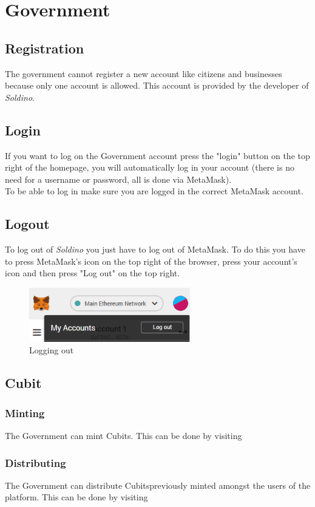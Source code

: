\section{Government}
	\subsection{Registration}
	The government cannot register a new account like citizens and 
	businesses because only one account is allowed. This account is provided 
	by the developer of \textit{Soldino}.
	\subsection{Login}
	If you want to log on the Government account press the "login" button on the 
	top right of the homepage, you will automatically log in your account 
	(there is no need for a username or password, all is done via MetaMask). 
	\\To be able to log in make sure you are logged in the correct MetaMask\glosp 
	account.
	\subsection{Logout}
	To log out of \textit{Soldino} you just have to log out of 
	MetaMask\glosp. To do this you have to press MetaMask's icon on the top 
	right of the browser, press your account's icon and then press "Log out"
	on the top right.
	\begin{figure}[H]
		\includegraphics[width=7cm]{res/images/logout_metamask.png}
		\centering
		\caption{Logging out}
	\end{figure}
	\subsection{Cubit}
		\subsubsection{Minting}
		The Government can mint Cubits\glo. This can be done by visiting 
%		
		\subsubsection{Distributing}
		The Government can distribute Cubits\glosp previously minted amongst the users 
		of the platform. This can be done by visiting 
%		

